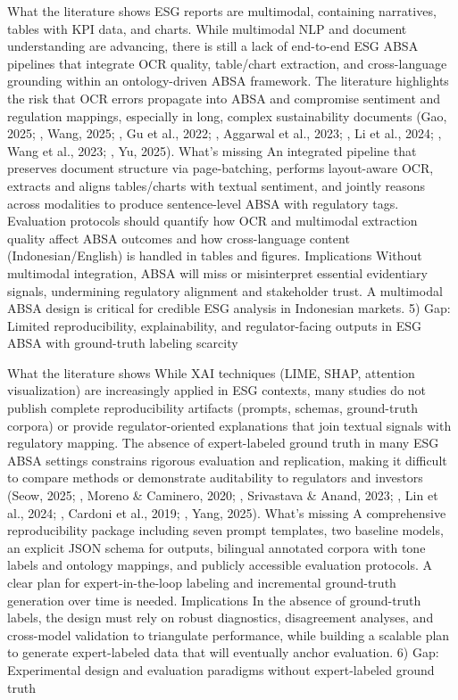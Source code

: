 What the literature shows
ESG reports are multimodal, containing narratives, tables with KPI data, and charts. While multimodal NLP and document understanding are advancing, there is still a lack of end-to-end ESG ABSA pipelines that integrate OCR quality, table/chart extraction, and cross-language grounding within an ontology-driven ABSA framework. The literature highlights the risk that OCR errors propagate into ABSA and compromise sentiment and regulation mappings, especially in long, complex sustainability documents (Gao, 2025; , Wang, 2025; , Gu et al., 2022; , Aggarwal et al., 2023; , Li et al., 2024; , Wang et al., 2023; , Yu, 2025).
What’s missing
An integrated pipeline that preserves document structure via page-batching, performs layout-aware OCR, extracts and aligns tables/charts with textual sentiment, and jointly reasons across modalities to produce sentence-level ABSA with regulatory tags. Evaluation protocols should quantify how OCR and multimodal extraction quality affect ABSA outcomes and how cross-language content (Indonesian/English) is handled in tables and figures.
Implications
Without multimodal integration, ABSA will miss or misinterpret essential evidentiary signals, undermining regulatory alignment and stakeholder trust. A multimodal ABSA design is critical for credible ESG analysis in Indonesian markets.
5) Gap: Limited reproducibility, explainability, and regulator-facing outputs in ESG ABSA with ground-truth labeling scarcity

What the literature shows
While XAI techniques (LIME, SHAP, attention visualization) are increasingly applied in ESG contexts, many studies do not publish complete reproducibility artifacts (prompts, schemas, ground-truth corpora) or provide regulator-oriented explanations that join textual signals with regulatory mapping. The absence of expert-labeled ground truth in many ESG ABSA settings constrains rigorous evaluation and replication, making it difficult to compare methods or demonstrate auditability to regulators and investors (Seow, 2025; , Moreno & Caminero, 2020; , Srivastava & Anand, 2023; , Lin et al., 2024; , Cardoni et al., 2019; , Yang, 2025).
What’s missing
A comprehensive reproducibility package including seven prompt templates, two baseline models, an explicit JSON schema for outputs, bilingual annotated corpora with tone labels and ontology mappings, and publicly accessible evaluation protocols. A clear plan for expert-in-the-loop labeling and incremental ground-truth generation over time is needed.
Implications
In the absence of ground-truth labels, the design must rely on robust diagnostics, disagreement analyses, and cross-model validation to triangulate performance, while building a scalable plan to generate expert-labeled data that will eventually anchor evaluation.
6) Gap: Experimental design and evaluation paradigms without expert-labeled ground truth

